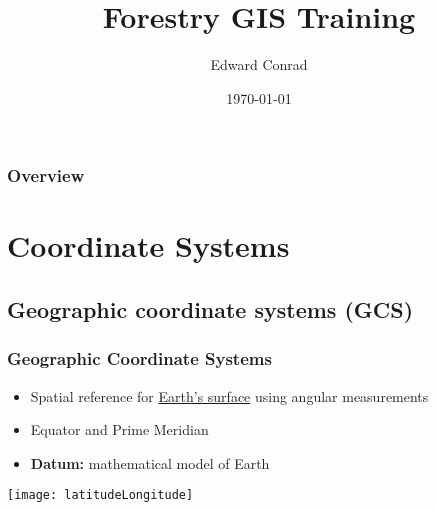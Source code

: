 \documentclass[t]{beamer} %
\title[Forestry GIS Training]{Forestry GIS Training} %
\author{Edward Conrad} %
\institute[] %
{
New Mexico State Forestry Division \\ %
\medskip
\textit{edward.conrad@state.nm.us} %
}
\date{\today} %
\begin{document}
\begin{frame}
\titlepage %
\end{frame}

\begin{frame}
\frametitle{Overview} %
\tableofcontents %
\end{frame}

\section{Coordinate Systems} %
\subsection{Geographic coordinate systems (GCS)} %

\begin{frame}
\frametitle{Geographic Coordinate Systems}
\begin{itemize}
\item Spatial reference for \underline{Earth's surface} using angular measurements \\
\item Equator and Prime Meridian \\
\item \textbf{Datum:} mathematical model of Earth 
\end{itemize}
\texttt{[image: latitudeLongitude]}
\end{frame}
\end{document}
